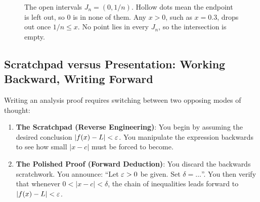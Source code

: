 \begin{figure}[htbp]
\centering
{}
\caption{The open intervals $J_n = (0, 1/n)$. Hollow dots mean the endpoint is left out, so $0$ is in none of them. Any $x > 0$, such as $x = 0.3$, drops out once $1/n \le x$. No point lies in every $J_n$, so the intersection is empty.}
\label{35:fig-open-intervals}
\end{figure}

\subsection{Scratchpad versus Presentation: Working Backward, Writing Forward}

Writing an analysis proof requires switching between two opposing modes of thought:

\begin{enumerate}
  \item \textbf{The Scratchpad (Reverse Engineering)}: You begin by assuming the desired conclusion $|f(x) - L| < \varepsilon$. You manipulate the expression backwards to see how small $|x - c|$ must be forced to become.
  \item \textbf{The Polished Proof (Forward Deduction)}: You discard the backwards scratchwork. You announce: ``Let $\varepsilon > 0$ be given. Set $\delta = \dots$''. You then verify that whenever $0 < |x - c| < \delta$, the chain of inequalities leads forward to $|f(x) - L| < \varepsilon$.
\end{enumerate}

